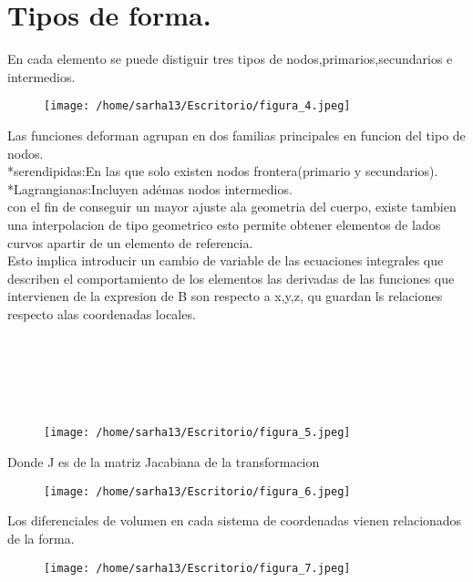 \documentclass[letter,openright,12pt,spanish]{report}
\begin{document}
\section{Tipos de forma.}
En cada elemento se puede distiguir tres tipos de nodos,primarios,secundarios e intermedios.

\begin{figure}[htp!]
\centering
\texttt{[image: /home/sarha13/Escritorio/figura\_4.jpeg]}
\caption{}
\label{Figura 5.}
\end{figure}

Las funciones deforman agrupan en dos familias principales en funcion del tipo de nodos.\\
*serendipidas:En las que solo existen nodos frontera(primario y secundarios).\\
*Lagrangianas:Incluyen adémas nodos intermedios.\\
con el fin de conseguir un mayor ajuste ala geometria del cuerpo, existe tambien una interpolacion de tipo geometrico esto permite obtener elementos de lados curvos apartir de un elemento de referencia.\\

Esto implica introducir un cambio de variable de las ecuaciones integrales que describen el comportamiento de los elementos las derivadas de las funciones que intervienen de la expresion de B son respecto a x,y,z, qu guardan ls relaciones respecto alas coordenadas locales.\\\\\\\\\\\\
\begin{figure}[htp!]
\centering
\texttt{[image: /home/sarha13/Escritorio/figura\_5.jpeg]}
\caption{}
\label{Figura 6.}
\end{figure}

Donde J es de la matriz Jacabiana de la transformacion

\begin{figure}[htp!]
\centering
\texttt{[image: /home/sarha13/Escritorio/figura\_6.jpeg]}
\caption{}
\label{Figura 7.}
\end{figure}

Los diferenciales de volumen en cada sistema de coordenadas vienen relacionados de la forma.

\begin{figure}[htp!]
\centering
\texttt{[image: /home/sarha13/Escritorio/figura\_7.jpeg]}
\caption{}
\label{Figura 7.}
\end{figure}
\end{document}
